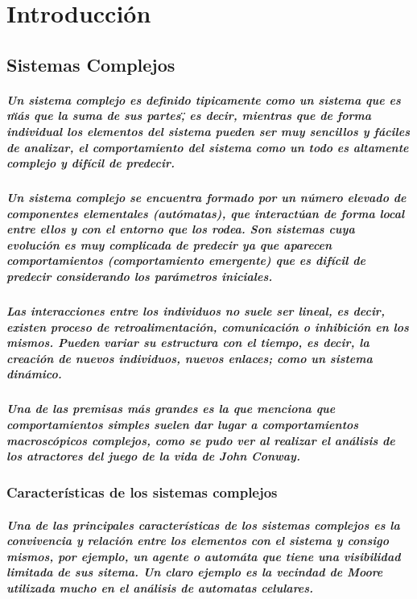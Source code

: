 %
\newpage
\chapter{Introducción}
  \section{Sistemas Complejos}
      \paragraph{Un sistema complejo es definido tipicamente como un sistema que es \"más que la suma de sus partes\", es decir, mientras que de forma individual los elementos del sistema pueden ser muy sencillos y fáciles de analizar, el comportamiento del sistema como un todo es altamente complejo y difícil de predecir.\cite{3}}
      \paragraph{Un sistema complejo se encuentra formado por un número elevado de componentes elementales (autómatas), que interactúan de forma local entre ellos y con el entorno que los rodea. Son sistemas cuya evolución es muy complicada de predecir ya que aparecen comportamientos (comportamiento emergente) que es difícil de predecir considerando los parámetros iniciales.}
      \paragraph{Las interacciones entre los individuos no suele ser lineal, es decir, existen proceso de retroalimentación, comunicación o inhibición en los mismos. Pueden variar su estructura con el tiempo, es decir, la creación de nuevos individuos, nuevos enlaces; como un sistema dinámico. \cite{1}}
      \paragraph{Una de las premisas más grandes es la que menciona que comportamientos simples suelen dar lugar a comportamientos macroscópicos complejos, como se pudo ver al realizar el análisis de los atractores del juego de la vida de John Conway.\cite{2}}
    \subsection{Características de los sistemas complejos}
      \paragraph{Una de las principales características de los sistemas complejos es la convivencia y relación entre los elementos con el sistema y consigo mismos, por ejemplo, un agente o automáta que tiene una visibilidad limitada de sus sitema. Un claro ejemplo es la vecindad de Moore utilizada mucho en el análisis de automatas celulares.\cite{4}}

